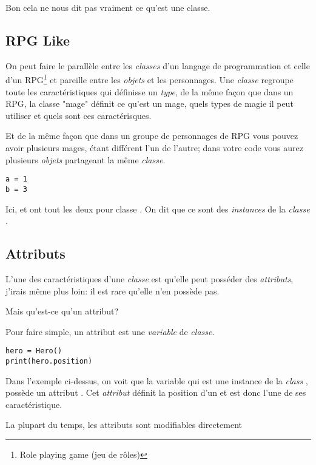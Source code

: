 Bon cela ne nous dit pas vraiment ce qu'est une classe.

\subsection{RPG Like}

On peut faire le parallèle entre les \emph{classes} d'un langage de programmation et celle d'un RPG\footnote{Role playing game (jeu de rôles)} et pareille entre les \emph{objets} et les personnages.
Une \emph{classe} regroupe toute les caractéristiques qui définisse un \emph{type}, de la même façon que dans un RPG, la classe "mage" définit ce qu'est un mage, quels types de magie il peut utiliser et quels sont ces caractérisques.

Et de la même façon que dans un groupe de personnages de RPG vous pouvez avoir plusieurs mages, étant différent l'un de l'autre; dans votre code vous aurez plusieurs \emph{objets} partageant la même \emph{classe}.

\begin{lstlisting}
a = 1
b = 3
\end{lstlisting}

Ici,  et  ont tout les deux pour classe .
On dit que ce sont des \emph{instances} de la \emph{classe} .

\subsection{Attributs}

L'une des caractéristiques d'une \emph{classe} est qu'elle peut posséder des \emph{attributs}, j'irais même plus loin: il est rare qu'elle n'en possède pas.

Mais qu'est-ce qu'un attribut?

Pour faire simple, un attribut est une \emph{variable} de \emph{classe}.

\begin{lstlisting}
hero = Hero()
print(hero.position) 
\end{lstlisting}

Dans l'exemple ci-dessus, on voit que la variable  qui est une instance de la \emph{class} , possède un attribut . Cet \emph{attribut} définit la position d'un  et est donc l'une de ses caractéristique.

La plupart du temps, les attributs sont modifiables directement  

